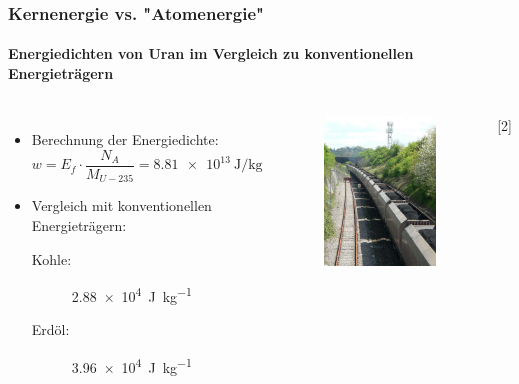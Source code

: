 \documentclass{beamer}[9pt]
\begin{document}
\begin{frame}
\frametitle{Kernenergie vs. "Atomenergie"}
\framesubtitle{Energiedichten von Uran im Vergleich zu konventionellen Energieträgern}
\begin{columns}
\begin{itemize}
\item Berechnung der Energiedichte:
\[
w = E_f \cdot \frac{ N_A }{M_{U-235}} = \SI{8.81e13}{\joule\per\kilogram}
\]
\item Vergleich mit konventionellen Energieträgern:\\

\begin{description}

\item[ Kohle:] \SI{2.88e4}{\joule\per\kg}
\item[Erdöl:] \SI{3.96e4}{\joule\per\kg}

\end{description}
\end{itemize}
\begin{figure}[htp]
\includegraphics[scale=.15]{coal.jpg}
\end{figure}
\hspace{.5\columnwidth}[2]
\end{columns}
\end{frame}
\end{document}
